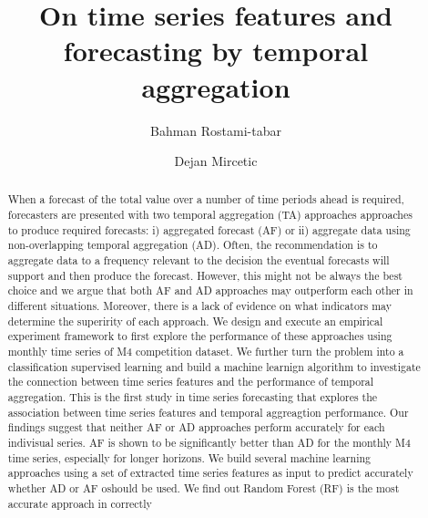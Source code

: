 \documentclass[]{elsarticle} %
\begin{document}
\begin{frontmatter}

  \title{On time series features and forecasting by temporal aggregation}
    \author[Cardiff Business School]{Bahman Rostami-tabar}
    \author[University of Novi Sad Faculty of Technical Sciences]{Dejan Mircetic}
      \address[Cardiff Business School]{Cardiff business school, 3 Colum Drive, CF10 3EU, Cardiff}
    \address[University of Novi Sad Faculty of Technical Sciences]{Faculty of Technical Sciences \& Institute for Artificial Intelligence
research and development of Serbia,Trg Dostiteja Obradovica 6, 2100 Novi
Sad, Republic of Serbia}
  
  \begin{abstract}
  When a forecast of the total value over a number of time periods ahead
  is required, forecasters are presented with two temporal aggregation
  (TA) approaches approaches to produce required forecasts: i) aggregated
  forecast (AF) or ii) aggregate data using non-overlapping temporal
  aggregation (AD). Often, the recommendation is to aggregate data to a
  frequency relevant to the decision the eventual forecasts will support
  and then produce the forecast. However, this might not be always the
  best choice and we argue that both AF and AD approaches may outperform
  each other in different situations. Moreover, there is a lack of
  evidence on what indicators may determine the superirity of each
  approach. We design and execute an empirical experiment framework to
  first explore the performance of these approaches using monthly time
  series of M4 competition dataset. We further turn the problem into a
  classification supervised learning and build a machine learnign
  algorithm to investigate the connection between time series features and
  the performance of temporal aggregation. This is the first study in time
  series forecasting that explores the association between time series
  features and temporal aggreagtion performance. Our findings suggest that
  neither AF or AD approaches perform accurately for each indivisual
  series. AF is shown to be significantly better than AD for the monthly
  M4 time series, especially for longer horizons. We build several machine
  learning approaches using a set of extracted time series features as
  input to predict accurately whether AD or AF oshould be used. We find
  out Random Forest (RF) is the most accurate approach in correctly

\end{abstract}
\end{frontmatter}
\end{document}
